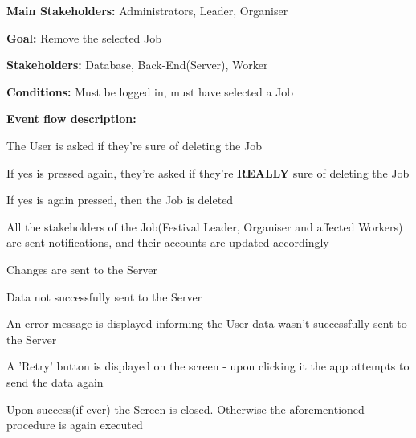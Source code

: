 			\noindent {}
			\begin{packed_item}
				\item \textbf{Main Stakeholders:} Administrators, Leader, Organiser
				\item \textbf{Goal:} Remove the selected Job
				\item \textbf{Stakeholders: } Database, Back-End(Server), Worker
				\item \textbf{Conditions: } Must be logged in, must have selected a Job
				\item \textbf{Event flow description: }
				\begin{packed_enum}
					\item The User is asked if they're sure of deleting the Job
					\item If yes is pressed again, they're asked if they're \textbf{REALLY} sure of deleting the Job
					\item If yes is again pressed, then the Job is deleted
					\item All the stakeholders of the Job(Festival Leader, Organiser and affected Workers) are sent notifications, and their accounts are updated accordingly
					\item Changes are sent to the Server
				\end{packed_enum}
				
				\begin{packed_item}
					\item[5.a] Data not successfully sent to the Server
					\item[] \begin{packed_enum}
						\item An error message is displayed informing the User data wasn't successfully sent to the Server
						\item A 'Retry' button is displayed on the screen - upon clicking it the app attempts to send the data again
						\item Upon success(if ever) the Screen is closed. Otherwise the aforementioned procedure is again executed
					\end{packed_enum}
				\end{packed_item}
			\end{packed_item}
			
